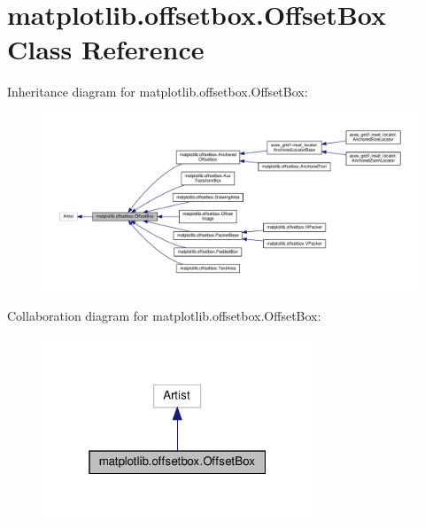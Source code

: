 \hypertarget{classmatplotlib_1_1offsetbox_1_1OffsetBox}{}\section{matplotlib.\+offsetbox.\+Offset\+Box Class Reference}
\label{classmatplotlib_1_1offsetbox_1_1OffsetBox}


Inheritance diagram for matplotlib.\+offsetbox.\+Offset\+Box\+:
\nopagebreak
\begin{figure}[H]
\begin{center}
\leavevmode
\includegraphics[width=350pt]{classmatplotlib_1_1offsetbox_1_1OffsetBox__inherit__graph}
\end{center}
\end{figure}


Collaboration diagram for matplotlib.\+offsetbox.\+Offset\+Box\+:
\nopagebreak
\begin{figure}[H]
\begin{center}
\leavevmode
\includegraphics[width=229pt]{classmatplotlib_1_1offsetbox_1_1OffsetBox__coll__graph}
\end{center}
\end{figure}
